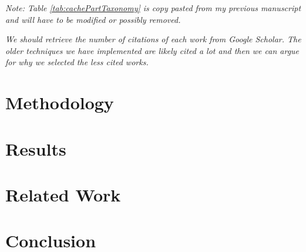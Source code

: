 \textit{Note: Table \ref{tab:cachePartTaxonomy} is copy pasted from my previous manuscript and will have to be modified or possibly removed.}



\textit{We should retrieve the number of citations of each work from Google Scholar.
The older techniques we have implemented are likely cited a lot and then we can argue for why we selected the less cited works.}

\section{Methodology}


\section{Results}


\section{Related Work}


\section{Conclusion}


